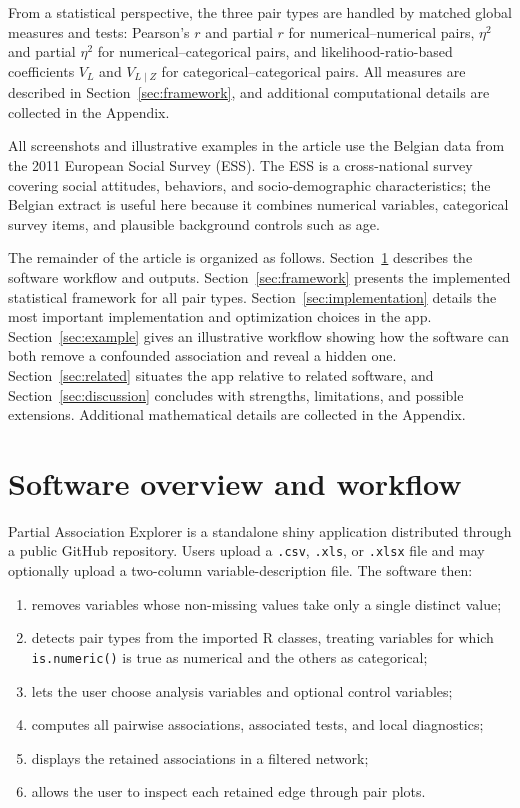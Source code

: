 \documentclass[11pt]{article}
\newcommand{\appname}{Partial Association Explorer}
\newcommand{\code}[1]{\texttt{#1}}
\newcommand{\pkg}[1]{\textsf{#1}}
\newcommand{\proglang}[1]{\textsf{#1}}
\begin{document}
From a statistical perspective, the three pair types are handled by matched
global measures and tests: Pearson's $r$ and partial $r$ for
numerical--numerical pairs, $\eta^2$ and partial $\eta^2$ for
numerical--categorical pairs, and likelihood-ratio-based coefficients $V_L$
and $V_{L\mid Z}$ for categorical--categorical pairs. All measures are
described in Section~\ref{sec:framework}, and additional computational details
are collected in the Appendix.

All screenshots and illustrative examples in the article use the Belgian data
from the 2011 European Social Survey (ESS). The ESS is a cross-national survey
covering social attitudes, behaviors, and socio-demographic characteristics;
the Belgian extract is useful here because it combines numerical variables,
categorical survey items, and plausible background controls such as age.

The remainder of the article is organized as follows. Section~\ref{sec:overview}
describes the software workflow and outputs. Section~\ref{sec:framework}
presents the implemented statistical framework for all pair types.
Section~\ref{sec:implementation} details the most important implementation and
optimization choices in the app. Section~\ref{sec:example} gives an
illustrative workflow showing how the software can both remove a confounded
association and reveal a hidden one. Section~\ref{sec:related} situates the app
relative to related software, and Section~\ref{sec:discussion} concludes with
strengths, limitations, and possible extensions. Additional mathematical
details are collected in the Appendix.

\section{Software overview and workflow}
\label{sec:overview}

\appname{} is a standalone \pkg{shiny} application distributed through a public
GitHub repository. Users upload a \code{.csv}, \code{.xls}, or \code{.xlsx}
file and may optionally upload a two-column variable-description file. The
software then:

\begin{enumerate}
  \item removes variables whose non-missing values take only a single distinct
    value;
  \item detects pair types from the imported \proglang{R} classes, treating
    variables for which \code{is.numeric()} is true as numerical and the others
    as categorical;
  \item lets the user choose analysis variables and optional control variables;
  \item computes all pairwise associations, associated tests, and local
    diagnostics;
  \item displays the retained associations in a filtered network;
  \item allows the user to inspect each retained edge through pair plots.
\end{enumerate}
\end{document}
